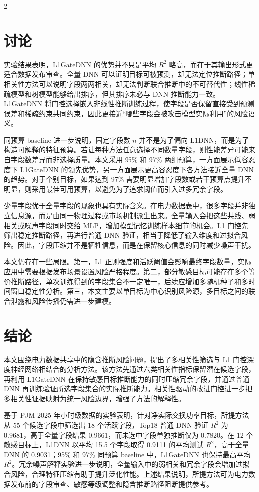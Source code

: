 \documentclass[UTF8,zihao=5,twoside]{ctexart}
\numberwithin{equation}{section}
\begin{document}
\begin{multicols}{2}

\section{讨论}
实验结果表明，L1GateDNN 的优势并不只是平均 $R^2$ 略高，而在于其输出形式更适合数据发布审查。全量 DNN 可以证明目标可被预测，却无法定位推断路径；单相关性方法可以说明字段两两相关，却无法判断联合推断中的不可替代性；线性稀疏模型和树模型能够给出排序，但其排序未必与 DNN 推断能力一致。L1GateDNN 将门控选择嵌入非线性推断训练过程，使字段是否保留直接受到预测误差和稀疏约束共同约束，因此更接近“哪些字段会被攻击模型实际利用”的风险语义。

同预算 baseline 进一步说明，固定字段数 $n$ 并不是为了偏向 L1DNN，而是为了构造可解释的特征预算。若让每种方法任意选择不同数量字段，则性能差异可能来自字段数差异而非选择质量。本文采用 95\% 和 97\% 两组预算，一方面展示低容忍度下 L1GateDNN 的领先优势，另一方面展示更高容忍度下各方法接近全量 DNN 的趋势。对于个别目标，如果达到 97\% 需要明显增加字段数或若干预算点提升不明显，则采用最佳可用预算，以避免为了追求阈值而引入过多冗余字段。

少量字段优于全量字段的现象也具有实际含义。在电力数据表中，很多字段并非独立信息源，而是由同一物理过程或市场机制派生出来。全量输入会把这些共线、弱相关或噪声字段同时交给 MLP，增加模型记忆训练样本细节的机会。L1 门控先筛出稳定推断路径，再进行普通 DNN 验证，相当于降低了输入维度和过拟合风险。因此，字段压缩并不是牺牲信息，而是在保留核心信息的同时减少噪声干扰。

本文仍存在一些局限。第一，L1 正则强度和活跃阈值会影响最终字段数量，实际应用中需要根据发布场景设置风险严格程度。第二，部分敏感目标可能存在多个等价推断路径，单次训练得到的字段集合不一定唯一，后续应增加多随机种子和多时间窗口稳定性分析。第三，本文主要以单目标为中心识别风险源，多目标之间的联合泄露和风险传播仍需进一步建模。

\section{结论}
本文围绕电力数据共享中的隐含推断风险问题，提出了多相关性筛选与 L1 门控深度神经网络相结合的分析方法。该方法先通过六类相关性指标保留潜在候选字段，再利用 L1GateDNN 在保持敏感目标推断能力的同时压缩冗余字段，并通过普通 DNN 再训练验证所选字段集合的实际推断能力。相关性驱动的改进门控进一步把多相关性证据映射为统一风险边界，增强了方法的解释性。

基于 PJM 2025 年小时级数据的实验表明，针对净实际交换功率目标，所提方法从 55 个候选字段中筛选出 18 个活跃字段，Top18 普通 DNN 验证 $R^2$ 为 0.9681，高于全量字段结果 0.9661，而未选中字段单独推断仅为 0.7820。在 12 个敏感目标上，L1DNN 以平均 15.5 个字段取得 0.9111 的平均测试 $R^2$，高于全量 DNN 的 0.9031；95\% 和 97\% 同预算 baseline 中，L1GateDNN 也保持最高平均 $R^2$。冗余噪声解释实验进一步说明，全量输入中的弱相关和冗余字段会增加过拟合风险，合理特征压缩有助于提升泛化性能。上述结果说明，所提方法可为电力数据发布前的字段审查、敏感等级调整和隐含推断路径阻断提供参考。


\end{multicols}
\end{document}
